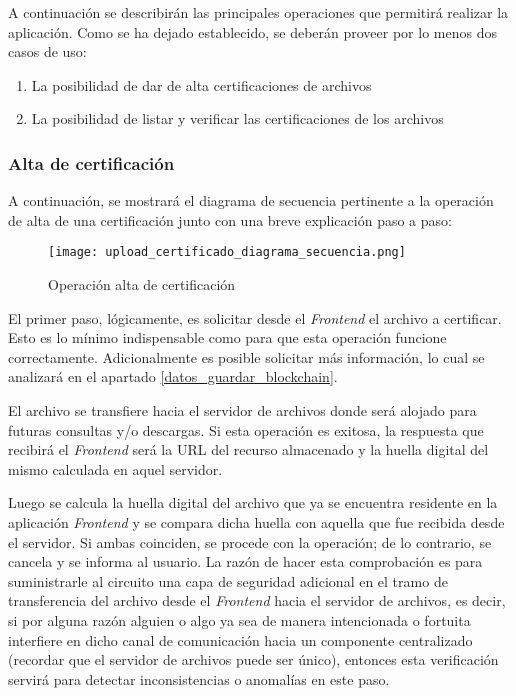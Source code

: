 A continuación se describirán las principales operaciones que permitirá realizar la aplicación. Como se ha dejado establecido, se deberán proveer por lo menos dos casos de uso:

\begin{enumerate}
  \item  La posibilidad de dar de alta certificaciones de archivos
  \item  La posibilidad de listar y verificar las certificaciones de los archivos
\end{enumerate}

\subsubsection{Alta de certificación}
\label{alta_certificacion}

A continuación, se mostrará el diagrama de secuencia pertinente a la operación de alta de una certificación junto con una breve explicación paso a paso:

\begin{figure}[H]
  \texttt{[image: upload\_certificado\_diagrama\_secuencia.png]}
  \centering
  \caption{Operación alta de certificación}
  \label{fig:upload-certificacion-diagrama-secuencia}
\end{figure}

El primer paso, lógicamente, es solicitar desde el \textit{Frontend} el archivo a certificar. Esto es lo mínimo indispensable como para que esta operación funcione correctamente. Adicionalmente es posible solicitar más información, lo cual se analizará en el apartado \ref{datos_guardar_blockchain}.

El archivo se transfiere hacia el servidor de archivos donde será alojado para futuras consultas y/o descargas. Si esta operación es exitosa, la respuesta que recibirá el \textit{Frontend} será la URL del recurso almacenado y la huella digital del mismo calculada en aquel servidor.

Luego se calcula la huella digital del archivo que ya se encuentra residente en la aplicación \textit{Frontend} y se compara dicha huella con aquella que fue recibida desde el servidor. Si ambas coinciden, se procede con la operación; de lo contrario, se cancela y se informa al usuario. La razón de hacer esta comprobación es para suministrarle al circuito una capa de seguridad adicional en el tramo de transferencia del archivo desde el \textit{Frontend} hacia el servidor de archivos, es decir, si por alguna razón alguien o algo ya sea de manera intencionada o fortuita interfiere en dicho canal de comunicación hacia un componente centralizado (recordar que el servidor de archivos puede ser único), entonces esta verificación servirá para detectar inconsistencias o anomalías en este paso.

